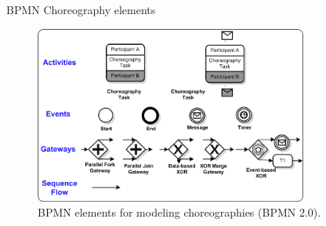 \documentclass[xcolor=svgnames]{beamer}
\begin{document}
  \begin{frame}{BPMN Choreography elements }
        \begin{figure}[!h]
    	      \centering
    	      \includegraphics[width=0.8\textwidth]{BPMNBasicChoroegraphy.png}
    	      \caption{BPMN elements for modeling choreographies (BPMN 2.0).}
          \end{figure}	
  \end{frame}
\end{document}
